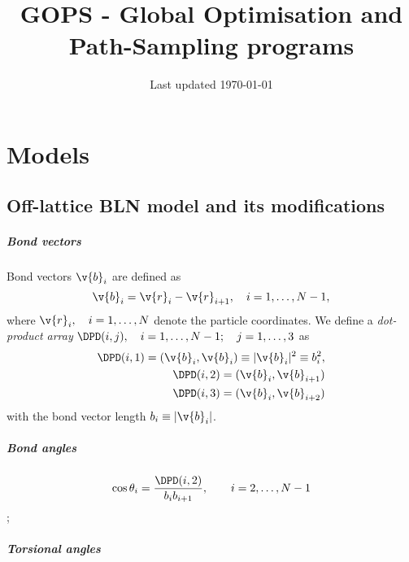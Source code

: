 \documentclass[12pt,a4paper,dvips]{book}
\numberwithin{equation}{section}
\begin{document}
\title{GOPS - Global Optimisation and Path-Sampling programs}
\date{Last updated \today}
\maketitle



%
%
%
%

\chapter{Models}

\section{Off-lattice BLN model and its modifications}

\paragraph{Bond vectors}

Bond vectors $\v{b}_i$ are defined as 
\begin{equation}
  \v{b}_i=\v{r}_i-\v{r}_{i+1},\quad i=1,\ldots,N-1,
  \label{bln-def-bv}
\end{equation}
where $\v{r}_i,\quad i=1,\ldots,N$ denote the particle coordinates. We define
a \emph{dot-product array} $\DPD(i,j),\quad i=1,\ldots, N-1;\quad j=1,\ldots,3$ as
\begin{align}
  \nonumber\DPD(i,1)=(\v{b}_i,\v{b}_i)\equiv |\v{b}_i|^2\equiv b_i^2,\\
  \nonumber\DPD(i,2)=(\v{b}_i,\v{b}_{i+1})\\
  \DPD(i,3)=(\v{b}_i,\v{b}_{i+2})
  \label{bln-def-dpd}
\end{align}
with the bond vector length $b_i\equiv|\v{b}_i|$.

\paragraph{Bond angles}

\begin{equation}
  \cos\theta_i=\frac{\DPD(i,2)}{b_ib_{i+1}},\qquad i=2,\ldots,N-1  
  \label{bln-bangle}
\end{equation};

\paragraph{Torsional angles}
\end{document}
